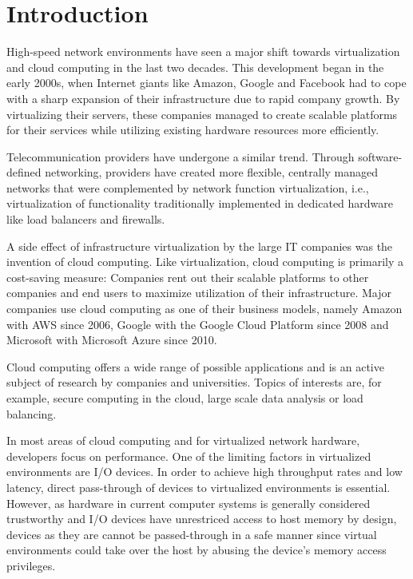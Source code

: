 \chapter{Introduction}
\label{chap:introduction}

High-speed network environments have seen a major shift towards virtualization
and cloud computing in the last two decades. This development began in the early
2000s, when Internet giants like Amazon, Google and Facebook had to cope with a
sharp expansion of their infrastructure due to rapid company growth. By
virtualizing their servers, these companies managed to create scalable platforms
for their services while utilizing existing hardware resources more efficiently.

Telecommunication providers have undergone a similar trend. Through
software-defined networking, providers have created more flexible, centrally
managed networks that were complemented by network function virtualization,
i.e., virtualization of functionality traditionally implemented in dedicated
hardware like load balancers and firewalls.

A side effect of infrastructure virtualization by the large IT companies was the
invention of cloud computing. Like virtualization, cloud computing is primarily
a cost-saving measure: Companies rent out their scalable platforms to other
companies and end users to maximize utilization of their infrastructure. Major
companies use cloud computing as one of their business models, namely Amazon
with AWS since 2006, Google with the Google Cloud Platform since 2008 and
Microsoft with Microsoft Azure since 2010.

Cloud computing offers a wide range of possible applications and is an active
subject of research by companies and universities. Topics of interests are, for
example, secure computing in the cloud, large scale data analysis or load
balancing.

In most areas of cloud computing and for virtualized network hardware,
developers focus on performance. One of the limiting factors in virtualized
environments are I/O devices. In order to achieve high throughput rates and low
latency, direct pass-through of devices to virtualized environments is
essential. However, as hardware in current computer systems is generally
considered trustworthy and I/O devices have unrestriced access to host memory by
design, devices as they are cannot be passed-through in a safe manner since
virtual environments could take over the host by abusing the device's memory
access privileges.

